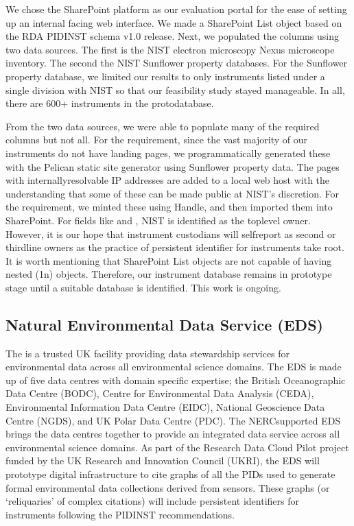 \documentclass[a4paper,10pt,english]{sphinxmanual}
\begin{document}
\sphinxAtStartPar
We chose the SharePoint platform as our evaluation portal for the ease
of setting up an internal facing web interface.  We made a SharePoint
List object based on the RDA PIDINST schema v1.0 release.  Next, we
populated the columns using two data sources.  The first is the NIST
electron microscopy Nexus microscope inventory.  The second the NIST
Sunflower property databases.  For the Sunflower property database, we
limited our results to only instruments listed under a single division
with NIST so that our feasibility study stayed manageable.  In all,
there are 600+ instruments in the proto\sphinxhyphen{}database.

\sphinxAtStartPar
From the two data sources, we were able to populate many of the
required columns but not all.  For the  requirement,
since the vast majority of our instruments do not have landing pages,
we programmatically generated these with the Pelican static site
generator using Sunflower property data.  The pages with
internally\sphinxhyphen{}resolvable IP addresses are added to a local web host with
the understanding that some of these can be made public at NIST’s
discretion.  For the  requirement, we minted these using
Handle, and then imported them into SharePoint.  For fields like
 and , NIST is identified as the top\sphinxhyphen{}level owner.
However, it is our hope that instrument custodians will self\sphinxhyphen{}report as
second or third\sphinxhyphen{}line owners as the practice of persistent identifier
for instruments take root.  It is worth mentioning that SharePoint
List objects are not capable of having nested (1\sphinxhyphen{}n) objects.
Therefore, our instrument database remains in prototype stage until a
suitable database is identified.  This work is on\sphinxhyphen{}going.


\subsection{Natural Environmental Data Service (EDS)}
\label{\detokenize{white-paper/adoption:natural-environmental-data-service-eds}}
\sphinxAtStartPar
The  is a trusted UK facility
providing data stewardship services for environmental data across
all environmental science domains. The EDS is made up of five data
centres with domain specific expertise; the British Oceanographic
Data Centre (BODC), Centre for Environmental Data Analysis (CEDA),
Environmental Information Data Centre (EIDC), National Geoscience
Data Centre (NGDS), and UK Polar Data Centre (PDC). The NERC\sphinxhyphen{}supported
EDS brings the data centres together to provide an integrated data
service across all environmental science domains. As part of the
Research Data Cloud Pilot project funded by the UK Research and
Innovation Council (UKRI), the EDS will prototype digital
infrastructure to cite graphs of all the PIDs used to generate
formal environmental data collections derived from sensors.
These graphs (or ‘reliquaries’ of complex citations) will include
persistent identifiers for instruments following the PIDINST
recommendations.
\end{document}

